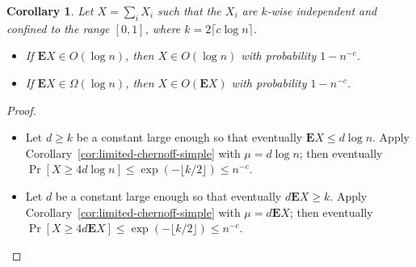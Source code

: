 \documentclass[11pt,a4paper]{article}
\newtheorem{corollary}[theorem]{Corollary}
\newcommand*{\E}[0]{\mathbf{E}}
\begin{document}
\begin{tcolorbox}
  \begin{corollary}
    Let \(X = \sum_i X_i\) such that the \(X_i\) are \(k\)-wise independent and confined to the range \([0, 1]\), where \(k = 2\lceil c\log n \rceil\).
    \begin{itemize}
    \item If \(\E X \in O(\log n)\), then  \(X \in O(\log n)\) with probability \(1 - n^{-c}\).
    \item If \(\E X \in \Omega(\log n)\), then \(X \in O(\E X)\) with probability \(1 - n^{-c}\).
    \end{itemize}
  \end{corollary}
\end{tcolorbox}
\begin{proof}\hfill
  \begin{itemize}
  \item
    Let \(d \ge k\) be a constant large enough so that eventually \(\E X \le d \log n\).
    Apply Corollary~\ref{cor:limited-chernoff-simple} with \(\mu = d \log n\); 
    then eventually \(\Pr[X \ge 4d \log n] \le \exp(-\lfloor k/2 \rfloor) \le n^{-c}\).
  \item
    Let \(d\) be a constant large enough so that eventually \(d \E X \ge k\).
    Apply Corollary~\ref{cor:limited-chernoff-simple} with \(\mu = d\E X\);
    then eventually \(\Pr[X \ge 4d\E X] \le \exp(-\lfloor k/2 \rfloor) \le n^{-c}\).
  \end{itemize}
\end{proof}
\end{document}
